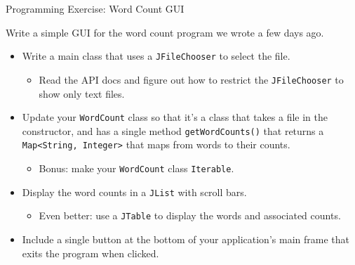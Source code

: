 \documentclass{beamer}
\begin{document}
\begin{frame}[fragile]{Programming Exercise: Word Count GUI}

Write a simple GUI for the word count program we wrote a few days ago.
\begin{itemize}
\item Write a main class that uses a {\tt JFileChooser} to select the file.
\begin{itemize}
\item Read the API docs and figure out how to restrict the {\tt JFileChooser} to show only text files.
\end{itemize}
\item Update your {\tt WordCount} class so that it's a class that takes a file in the constructor, and has a single method {\tt getWordCounts()} that returns a {\tt Map<String, Integer>} that maps from words to their counts.
\begin{itemize}
\item Bonus: make your {\tt WordCount} class {\tt Iterable}.
\end{itemize}

\item Display the word counts in a {\tt JList} with scroll bars.
\begin{itemize}
\item Even better: use a {\tt JTable} to display the words and associated counts.
\end{itemize}
\item Include a single button at the bottom of your application's main frame that exits the program when clicked.
\end{itemize}


\end{frame}







\end{document}
